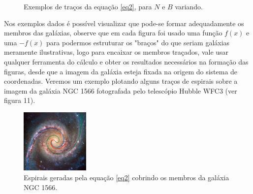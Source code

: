 \documentclass[twoside,a4paper,10pt]{article}
\begin{document}
\begin{figure}[!h]
	\centering
\end{figure}

\begin{figure}[!h]
	\centering
	\caption{Exemplos de traços da equação \eqref{eq2}, para $N$ e $B$ variando.}
\end{figure}

Nos exemplos dados é possível visualizar que pode-se formar adequadamente os membros das galáxias, observe que em cada figura foi usado uma função $f(x)$ e uma $-f(x)$ para podermos estruturar os "braços" do que seriam galáxias meramente ilustrativas, logo para encaixar os membros traçados, vale usar qualquer ferramenta do cálculo e obter os resultados necessários na formação das figuras, desde que a imagem da galáxia esteja fixada na origem do sistema de coordenadas. Veremos um exemplo plotando alguns traços de espirais sobre a imagem da galáxia NGC 1566 fotografada pelo telescópio Hubble WFC3 (ver figura 11).

\begin{figure}[!h]
	\centering
	\includegraphics[width=0.3\textwidth]{NGC1566}
	\caption{Espirais geradas pela equação \eqref{eq2} cobrindo os membros da galáxia NGC 1566.}
\end{figure}
\end{document}
